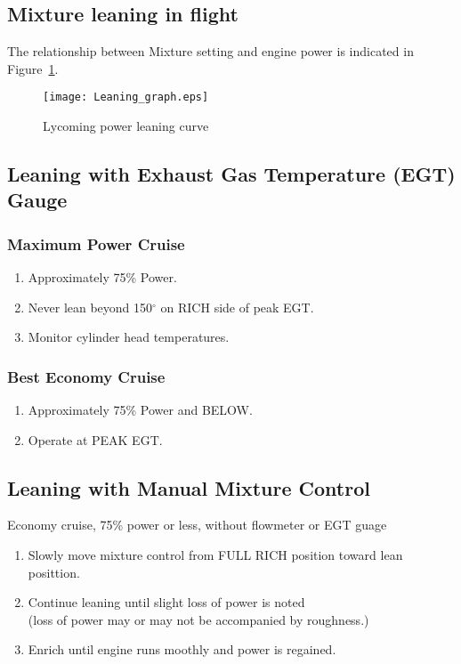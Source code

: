 \subsection{Mixture leaning in flight}
The relationship between Mixture setting and engine power is indicated in Figure~\ref{fig:Leaning_graph}.

\begin{figure}[H]
\centering
\texttt{[image: Leaning\_graph.eps]}
\caption{Lycoming power leaning curve}
\label{fig:Leaning_graph}
\end{figure}

\subsection{Leaning with Exhaust Gas Temperature (EGT) Gauge}
\subsubsection{Maximum Power Cruise}
\begin{enumerate}[(1)]
\item Approximately 75\% Power.
\item Never lean beyond 150$^{\circ}$ on RICH side of peak EGT.
\item Monitor cylinder head temperatures.
\end{enumerate}

\subsubsection{Best Economy Cruise}
\begin{enumerate}[(1)]
\item Approximately 75\% Power and BELOW.
\item Operate at PEAK EGT.
\end{enumerate}

\subsection{Leaning with Manual Mixture Control}
Economy cruise, 75\% power or less, without flowmeter or EGT guage
\begin{enumerate}[(1)]
\item Slowly move mixture control from FULL RICH position toward lean posittion.
\item Continue leaning until slight loss of power is noted\\ (loss of power may or may not be accompanied by roughness.)
\item Enrich until engine runs moothly and power is regained.
\end{enumerate}

